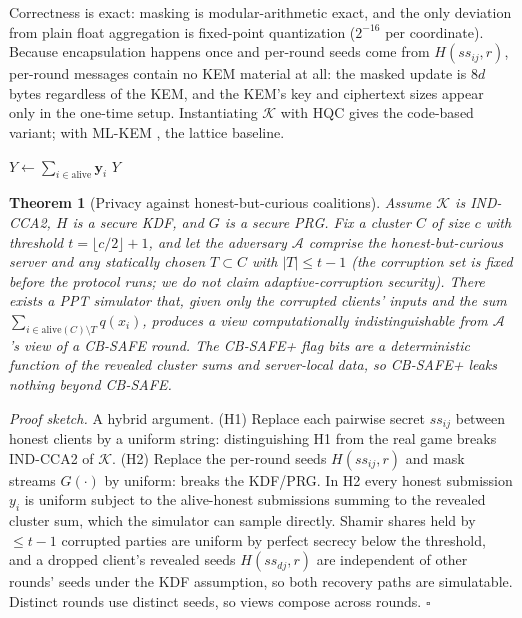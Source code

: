 \documentclass[lettersize,journal]{IEEEtran}
\newtheorem{theorem}{Theorem}
\begin{document}
Correctness is exact: masking is modular-arithmetic exact, and the only deviation
from plain float aggregation is fixed-point quantization ($2^{-16}$ per coordinate).
Because encapsulation happens once and per-round seeds come from $H(ss_{ij}, r)$,
per-round messages contain no KEM material at all: the masked update is $8d$ bytes
regardless of the KEM, and the KEM's key and ciphertext sizes appear only in the
one-time setup. Instantiating $\mathcal{K}$ with HQC gives the code-based variant;
with ML-KEM \cite{fips203}, the lattice baseline.

\begin{algorithm}[t]
\caption{Cluster Secure Aggregation (round $r$)}
\label{alg:secagg}
\DontPrintSemicolon
{}
$Y \leftarrow \sum_{i\in\mathrm{alive}} \mathbf{y}_i$ 
\Return $Y$\;
\end{algorithm}

\begin{theorem}[Privacy against honest-but-curious coalitions]\label{thm:priv}
Assume $\mathcal{K}$ is IND-CCA2, $H$ is a secure KDF, and $G$ is a secure PRG. Fix
a cluster $C$ of size $c$ with threshold $t=\lfloor c/2\rfloor+1$, and let the
adversary $\mathcal{A}$ comprise the honest-but-curious server and any statically
chosen $T \subset C$ with $|T| \le t-1$ (the corruption set is fixed before the
protocol runs; we do not claim adaptive-corruption security). There exists a PPT simulator that, given only the corrupted
clients' inputs and the sum $\sum_{i \in \mathrm{alive}(C)\setminus T} q(x_i)$,
produces a view computationally indistinguishable from $\mathcal{A}$'s view of a
CB-SAFE round. The CB-SAFE+ flag bits are a deterministic function of the revealed
cluster sums and server-local data, so CB-SAFE+ leaks nothing beyond CB-SAFE.
\end{theorem}

\emph{Proof sketch.} A hybrid argument. (H1) Replace each pairwise secret $ss_{ij}$
between honest clients by a uniform string: distinguishing H1 from the real game
breaks IND-CCA2 of $\mathcal{K}$. (H2) Replace the per-round seeds $H(ss_{ij},r)$
and mask streams $G(\cdot)$ by uniform: breaks the KDF/PRG. In H2 every honest
submission $y_i$ is uniform subject to the alive-honest submissions summing to the
revealed cluster sum, which the simulator can sample directly. Shamir shares held by
$\le t-1$ corrupted parties are uniform by perfect secrecy below the threshold, and
a dropped client's revealed seeds $H(ss_{dj}, r)$ are independent of other rounds'
seeds under the KDF assumption, so both recovery paths are simulatable. Distinct
rounds use distinct seeds, so views compose across rounds. \hfill$\square$
\end{document}
